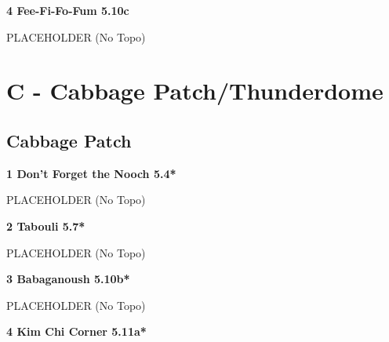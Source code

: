 \begin{multicols}{2}
			
			
			\needspace{1.5cm}
\label{rt:Fee-Fi-Fo-Fum}
\colorbox{RoyalBlue!20}{
\parbox{0.95\linewidth}{
\textbf{
4 Fee-Fi-Fo-Fum 5.10c  
}}}

			\begin{adjustwidth}{0.5cm}{}			
			PLACEHOLDER (No Topo)
			\end{adjustwidth}
			
			
		
	
\newpage
	
		\section{C - Cabbage Patch/Thunderdome}\label{sa:Cabbage Patch/Thunderdome}
	
	
	
		
		\needspace{1.5cm}
		\subsection*{Cabbage Patch}\label{bf:Cabbage Patch}
			
		
			
			\needspace{1.5cm}
\label{rt:Don't Forget the Nooch}
\colorbox{green!20}{
\parbox{0.95\linewidth}{
\textbf{
1 Don't Forget the Nooch 5.4*  
}}}

			\begin{adjustwidth}{0.5cm}{}			
			PLACEHOLDER (No Topo)
			\end{adjustwidth}
			
			
			
			\needspace{1.5cm}
\label{rt:Tabouli}
\colorbox{green!20}{
\parbox{0.95\linewidth}{
\textbf{
2 Tabouli 5.7*  
}}}

			\begin{adjustwidth}{0.5cm}{}			
			PLACEHOLDER (No Topo)
			\end{adjustwidth}
			
			
			
			\needspace{1.5cm}
\label{rt:Babaganoush}
\colorbox{RoyalBlue!20}{
\parbox{0.95\linewidth}{
\textbf{
3 Babaganoush 5.10b*  
}}}

			\begin{adjustwidth}{0.5cm}{}			
			PLACEHOLDER (No Topo)
			\end{adjustwidth}
			
			
			
			\needspace{1.5cm}
\label{rt:Kim Chi Corner}
\colorbox{RoyalBlue!20}{
\parbox{0.95\linewidth}{
\textbf{
4 Kim Chi Corner 5.11a*  
}}}


\end{multicols}
